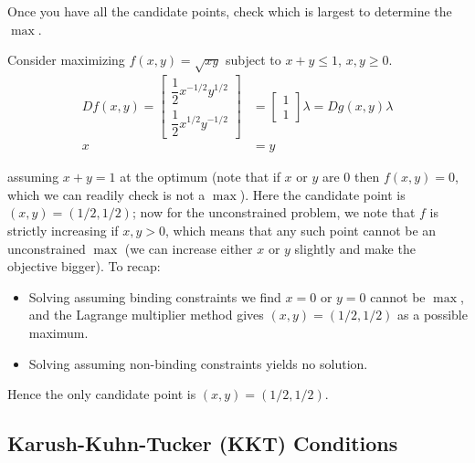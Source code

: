 \documentclass{article}
\begin{document}
Once you have all the candidate points, check which is largest to determine the $\max$.
\begin{example}
  Consider maximizing $f(x, y) = \sqrt{xy}$ subject to $x + y \le 1$, $x, y \ge 0$.
  \begin{align*}
    Df(x, y)
    =
    \begin{bmatrix}
      \dfrac{1}{2} x^{-1/2} y^{1/2}
      \\
      \dfrac{1}{2} x^{1/2} y^{-1/2}
    \end{bmatrix}
    &
    =
    \begin{bmatrix}
      1
      \\
      1
    \end{bmatrix}
    \lambda
    =
    Dg(x, y) \lambda
    \\
    x & = y
  \end{align*}

  assuming  $x + y = 1$ at the optimum (note that if $x$ or $y$ are $0$ then $f(x, y) = 0$, which we can readily check is not a $\max$).  Here the candidate point is $(x, y) = (1/2, 1/2)$; now for the unconstrained problem, we note that $f$ is strictly increasing if $x, y > 0$, which means that any such point cannot be an unconstrained $\max$ (we can increase either $x$ or $y$ slightly and make the objective bigger). To recap:
  \begin{itemize}[label=$\bullet$]
    \item Solving assuming binding constraints we find $x = 0$ or $y = 0$ cannot be $\max$, and the Lagrange multiplier method  gives $(x, y) = (1/2, 1/2)$ as a possible maximum.

    \item Solving assuming non-binding constraints yields no solution.
  \end{itemize}

  Hence the only candidate point is $(x, y) = (1/2, 1/2)$.
\end{example}

\subsection{Karush-Kuhn-Tucker (KKT) Conditions}
\label{sub:karush_kuhn_tucker_kkt_conditions}
\end{document}
